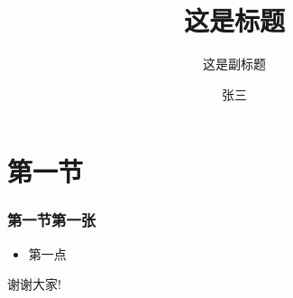 \documentclass{beamer}
\title{这是标题}
\subtitle{这是副标题}
\author{张三}
\institute{南京大学}
\date{\zhtoday}
\begin{document}
    \frame{\maketitle}


    \section{第一节}

    \begin{frame}
      \frametitle{第一节第一张}
      \begin{itemize}
        \item 第一点
      \end{itemize}
    \end{frame}


    \begin{frame}
      \centering
      \Huge 谢谢大家!
    \end{frame}
\end{document}

